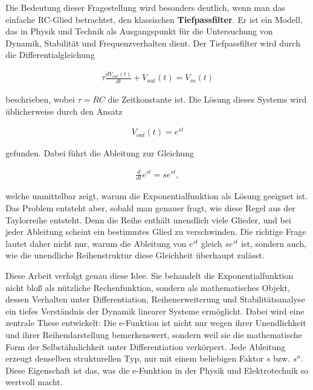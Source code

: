 \documentclass[a4paper, 12pt, twoside, openright]{report}
\theoremstyle{definition}
\theoremstyle{definition}
\begin{document}
Die Bedeutung dieser Fragestellung wird besonders deutlich, wenn man das einfache RC-Glied betrachtet, den klassischen \textbf{Tiefpassfilter}. Er ist ein Modell, das in Physik und Technik als Ausgangspunkt für die Untersuchung von Dynamik, Stabilität und Frequenzverhalten dient. Der Tiefpassfilter wird durch die Differentialgleichung

\begin{align}
    \tau \frac{dV_{out}(t)}{dt} + V_{out}(t) = V_{in}(t)
\end{align}

beschrieben, wobei $\tau = RC$ die Zeitkonstante ist. Die Lösung dieses Systems wird üblicherweise durch den Ansatz

\begin{align}
    V_{out}(t) = e^{st}
\end{align}

gefunden. Dabei führt die Ableitung zur Gleichung

\begin{align}
    \frac{d}{dt} e^{st} = s e^{st},
\end{align}

welche unmittelbar zeigt, warum die Exponentialfunktion als Lösung geeignet ist. Das Problem entsteht aber, sobald man genauer fragt, wie diese Regel aus der Taylorreihe entsteht. Denn die Reihe enthält unendlich viele Glieder, und bei jeder Ableitung scheint ein bestimmtes Glied zu verschwinden. Die richtige Frage lautet daher nicht nur, warum die Ableitung von $e^{st}$ gleich $s e^{st}$ ist, sondern auch, wie die unendliche Reihenstruktur diese Gleichheit überhaupt zulässt.

Diese Arbeit verfolgt genau diese Idee. Sie behandelt die Exponentialfunktion nicht bloß als nützliche Rechenfunktion, sondern als mathematisches Objekt, dessen Verhalten unter Differentiation, Reihenerweiterung und Stabilitätsanalyse ein tiefes Verständnis der Dynamik linearer Systeme ermöglicht. Dabei wird eine zentrale These entwickelt: Die e-Funktion ist nicht nur wegen ihrer Unendlichkeit und ihrer Reihendarstellung bemerkenswert, sondern weil sie die mathematische Form der Selbstähnlichkeit unter Differentiation verkörpert. Jede Ableitung erzeugt denselben strukturellen Typ, nur mit einem beliebigen Faktor $s$ bzw. $s^n$. Diese Eigenschaft ist das, was die e-Funktion in der Physik und Elektrotechnik so wertvoll macht.
\end{document}
